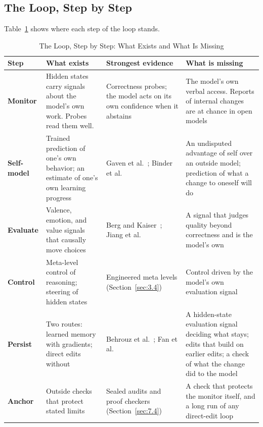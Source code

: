 \documentclass[journal]{IEEEtran}
\begin{document}
\subsection{The Loop, Step by Step}\label{sec:9.1}

Table~\ref{tab:6} shows where each step of the loop stands.

\begin{table}[!t]
\caption{The Loop, Step by Step: What Exists and What Is Missing}\label{tab:6}
\centering\footnotesize\renewcommand{\arraystretch}{1.15}
\begin{tabularx}{\textwidth}{@{}l>{\raggedright\arraybackslash}X>{\raggedright\arraybackslash}X>{\raggedright\arraybackslash}X@{}}
\toprule
\textbf{Step} & \textbf{What exists} & \textbf{Strongest evidence} & \textbf{What is missing} \\
\midrule
\textbf{Monitor} & Hidden states carry signals about the model's own work. Probes read them well. & Correctness probes; the model acts on its own confidence when it abstains~\cite{Kumaran2026} & The model's own verbal access. Reports of internal changes are at chance in open models~\cite{Ferrara2026b} \\
\textbf{Self-model} & Trained prediction of one's own behavior; an estimate of one's own learning progress & Gaven et al.~\cite{Gaven2025}; Binder et al.~\cite{Binder2024} & An undisputed advantage of self over an outside model; prediction of what a change to oneself will do \\
\textbf{Evaluate} & Valence, emotion, and value signals that causally move choices & Berg and Kaiser~\cite{Berg2026}; Jiang et al.~\cite{Jiang2026} & A signal that judges quality beyond correctness and is the model's own \\
\textbf{Control} & Meta-level control of reasoning; steering of hidden states & Engineered meta levels (Section~\ref{sec:3.4}) & Control driven by the model's own evaluation signal \\
\textbf{Persist} & Two routes: learned memory with gradients; direct edits without & Behrouz et al.~\cite{Behrouz2026}; Fan et al.~\cite{Fan2026} & A hidden-state evaluation signal deciding what stays; edits that build on earlier edits; a check of what the change did to the model \\
\textbf{Anchor} & Outside checks that protect stated limits & Sealed audits and proof checkers (Section~\ref{sec:7.4}) & A check that protects the monitor itself, and a long run of any direct-edit loop \\
\bottomrule
\end{tabularx}
\end{table}
\end{document}
